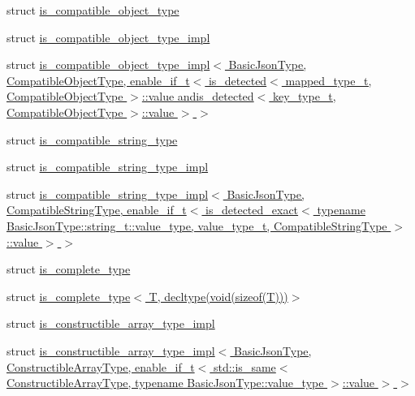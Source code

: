 \begin{DoxyCompactItemize}
\item 
struct \hyperlink{structnlohmann_1_1detail_1_1is__compatible__object__type}{is\+\_\+compatible\+\_\+object\+\_\+type}
\item 
struct \hyperlink{structnlohmann_1_1detail_1_1is__compatible__object__type__impl}{is\+\_\+compatible\+\_\+object\+\_\+type\+\_\+impl}
\item 
struct \hyperlink{structnlohmann_1_1detail_1_1is__compatible__object__type__impl_3_01_basic_json_type_00_01_compat75620afbe5f5959fc5f30d50406483f9}{is\+\_\+compatible\+\_\+object\+\_\+type\+\_\+impl$<$ Basic\+Json\+Type, Compatible\+Object\+Type, enable\+\_\+if\+\_\+t$<$ is\+\_\+detected$<$ mapped\+\_\+type\+\_\+t, Compatible\+Object\+Type $>$\+::value andis\+\_\+detected$<$ key\+\_\+type\+\_\+t, Compatible\+Object\+Type $>$\+::value $>$ $>$}
\item 
struct \hyperlink{structnlohmann_1_1detail_1_1is__compatible__string__type}{is\+\_\+compatible\+\_\+string\+\_\+type}
\item 
struct \hyperlink{structnlohmann_1_1detail_1_1is__compatible__string__type__impl}{is\+\_\+compatible\+\_\+string\+\_\+type\+\_\+impl}
\item 
struct \hyperlink{structnlohmann_1_1detail_1_1is__compatible__string__type__impl_3_01_basic_json_type_00_01_compat6590904cab40fc73f430e4c7518179a2}{is\+\_\+compatible\+\_\+string\+\_\+type\+\_\+impl$<$ Basic\+Json\+Type, Compatible\+String\+Type, enable\+\_\+if\+\_\+t$<$ is\+\_\+detected\+\_\+exact$<$ typename Basic\+Json\+Type\+::string\+\_\+t\+::value\+\_\+type, value\+\_\+type\+\_\+t, Compatible\+String\+Type $>$\+::value $>$ $>$}
\item 
struct \hyperlink{structnlohmann_1_1detail_1_1is__complete__type}{is\+\_\+complete\+\_\+type}
\item 
struct \hyperlink{structnlohmann_1_1detail_1_1is__complete__type_3_01_t_00_01decltype_07void_07sizeof_07_t_08_08_08_4}{is\+\_\+complete\+\_\+type$<$ T, decltype(void(sizeof(\+T)))$>$}
\item 
struct \hyperlink{structnlohmann_1_1detail_1_1is__constructible__array__type__impl}{is\+\_\+constructible\+\_\+array\+\_\+type\+\_\+impl}
\item 
struct \hyperlink{structnlohmann_1_1detail_1_1is__constructible__array__type__impl_3_01_basic_json_type_00_01_cons8cf88e17d5eaa68665a8fb4b97604b0e}{is\+\_\+constructible\+\_\+array\+\_\+type\+\_\+impl$<$ Basic\+Json\+Type, Constructible\+Array\+Type, enable\+\_\+if\+\_\+t$<$ std\+::is\+\_\+same$<$ Constructible\+Array\+Type, typename Basic\+Json\+Type\+::value\+\_\+type $>$\+::value $>$ $>$}

\end{DoxyCompactItemize}
